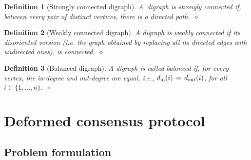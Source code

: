 \documentclass[letterpaper,9pt,twocolumn]{autart}
\newtheorem{definition}{\textbf{Definition}}
\begin{document}
\begin{definition}[Strongly connected digraph]
A~digraph is strongly connected if, between every pair of
distinct vertices, there is a directed path.~\hfill$\diamond$
\end{definition}

\begin{definition}[Weakly connected digraph]
A digraph is weakly connected if its disoriented version 
(i.e. the graph obtained by replacing all its directed edges with undirected ones), 
is connected.~\hfill$\diamond$
\end{definition}

\begin{definition}[Balanced digraph]
A digraph is called balanced if, for every vertex, the in-degree and out-degree are equal, i.e.,
$d_{\textup{in}}(i)\,=\,d_{\textup{out}}(i)$, for all $i \in \{1,\ldots,n\}$.~\hfill$\diamond$
\end{definition}

\section{Deformed consensus protocol}\label{SEC:Prob}

\subsection{Problem formulation}\label{SEC:Form_Prob}
\end{document}
